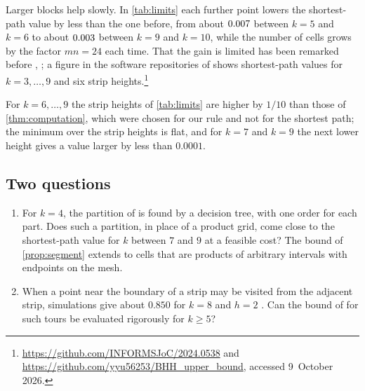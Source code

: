 Larger blocks help slowly. In \cref{tab:limits} each further point lowers the shortest-path value by less than the one before, from about $0.007$ between $k=5$ and $k=6$ to about $0.003$ between $k=9$ and $k=10$, while the number of cells grows by the factor $mn=24$ each time. That the gain is limited has been remarked before \cite[Section~2.5]{Steinerberger2015}, \cite[Sections~3 and~5]{GaudioGuan2026}; a figure in the software repositories of \cite{CarlssonYu2026,YuCarlsson2023} shows shortest-path values for $k=3,\dots,9$ and six strip heights.\footnote{\raggedright\url{https://github.com/INFORMSJoC/2024.0538} and \url{https://github.com/yyu56253/BHH_upper_bound}, accessed 9~October 2026.}

For $k=6,\dots,9$ the strip heights of \cref{tab:limits} are higher by $1/10$ than those of \cref{thm:computation}, which were chosen for our rule and not for the shortest path; the minimum over the strip heights is flat, and for $k=7$ and $k=9$ the next lower height gives a value larger by less than $0.0001$.

\subsection{Two questions}

\begin{enumerate}[label=(\arabic*),leftmargin=*]
\item For $k=4$, the partition of \cite{YuCarlsson2023} is found by a decision tree, with one order for each part. Does such a partition, in place of a product grid, come close to the shortest-path value for $k$ between $7$ and $9$ at a feasible cost? The bound of \cref{prop:segment} extends to cells that are products of arbitrary intervals with endpoints on the mesh.
\item When a point near the boundary of a strip may be visited from the adjacent strip, simulations give about $0.850$ for $k=8$ and $h=2$ \cite[Table~4]{GaudioGuan2026}. Can the bound of \cite{GaudioGuan2026} for such tours be evaluated rigorously for $k\ge5$?
\end{enumerate}
